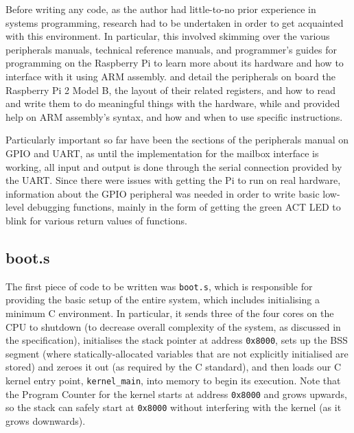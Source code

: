 \documentclass[10pt,a4paper]{article}
\newcommand{\code}[1]{\texttt{#1}}
\begin{document}
Before writing any code, as the author had little-to-no prior experience in
systems programming, research had to be undertaken in order to get acquainted
with this environment. In particular, this involved skimming over the various
peripherals manuals, technical reference manuals, and programmer's guides for
programming on the Raspberry Pi to learn more about its hardware and how to
interface with it using ARM assembly. \cite{BCM2835} and \cite{BCM2836} detail the
peripherals on board the Raspberry Pi 2 Model B, the layout of their related
registers, and how to read and write them to do meaningful things with the
hardware, while \cite{TRM} and \cite{PG} provided help on ARM assembly's syntax,
and how and when to use specific instructions.

Particularly important so far have been the sections of the peripherals manual
on GPIO and UART, as until the implementation for the mailbox interface is
working, all input and output is done through the serial connection provided by
the UART.  Since there were issues with getting the Pi to run on real hardware,
information about the GPIO peripheral was needed in order to write basic
low-level debugging functions, mainly in the form of getting the green ACT LED
to blink for various return values of functions.

\subsection{boot.s}
The first piece of code to be written was \code{boot.s}, which is responsible
for providing the basic setup of the entire system, which includes initialising
a minimum C environment. In particular, it sends three of the four cores on the
CPU to shutdown (to decrease overall complexity of the system, as discussed in
the specification), initialises the stack pointer at address \code{0x8000}, sets
up the BSS segment (where statically-allocated variables that are not explicitly
initialised are stored) and zeroes it out (as required by the C standard), and
then loads our C kernel entry point, \code{kernel\_main}, into memory to begin
its execution. Note that the Program Counter for the kernel starts at address
\code{0x8000} and grows upwards, so the stack can safely start at \code{0x8000}
without interfering with the kernel (as it grows downwards).
\end{document}
